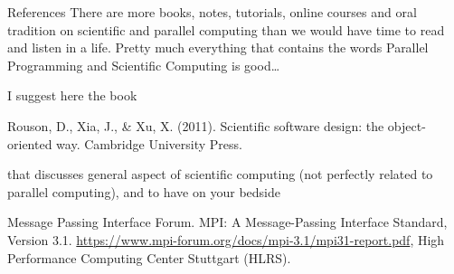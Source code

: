 \documentclass[xcolor={svgnames,usenames}]{beamer}
\begin{document}
\begin{frame}{References}
There are more books, notes, tutorials, online courses and oral tradition on scientific and parallel computing than we would have time to read and listen in a life. Pretty much everything that contains the words Parallel Programming and Scientific Computing is good\ldots 

I suggest here the book
\begin{thebibliography}{10}
	 Rouson, D., Xia, J., \& Xu, X. (2011). Scientific software design: the object-oriented way. Cambridge University Press.
\end{thebibliography}
that discusses general aspect of scientific computing (not perfectly related to parallel computing), and to have on your bedside
\begin{thebibliography}{10}
	  Message Passing Interface Forum. MPI: A Message-Passing Interface Standard, Version 3.1. \url{https://www.mpi-forum.org/docs/mpi-3.1/mpi31-report.pdf}, High Performance Computing Center Stuttgart (HLRS).
\end{thebibliography}
\end{frame}
\end{document}
